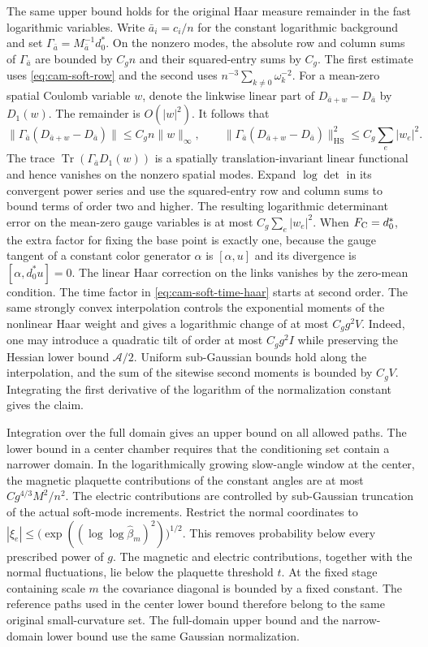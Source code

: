 \documentclass[11pt,a4paper]{article}
\numberwithin{equation}{section}
\newcommand{\Tr}{\operatorname{Tr}}
\begin{document}
The same upper bound holds for the original Haar measure remainder in the fast logarithmic variables. Write \(\bar a_i=c_i/n\) for the constant logarithmic background and set \(\Gamma_{\bar a}=M_{\bar a}^{-1}d_0^*\). On the nonzero modes, the absolute row and column sums of \(\Gamma_{\bar a}\) are bounded by \(C_gn\) and their squared-entry sums by \(C_g\). The first estimate uses \eqref{eq:cam-soft-row} and the second uses \(n^{-3}\sum_{k\ne0}\omega_k^{-2}\). For a mean-zero spatial Coulomb variable \(w\), denote the linkwise linear part of \(D_{\bar a+w}-D_{\bar a}\) by \(D_1(w)\). The remainder is \(O(|w|^2)\). It follows that
\[
 \|\Gamma_{\bar a}(D_{\bar a+w}-D_{\bar a})\|\le C_gn\|w\|_\infty,\qquad
 \|\Gamma_{\bar a}(D_{\bar a+w}-D_{\bar a})\|_{\mathrm{HS}}^2\le C_g\sum_e|w_e|^2 .
\]
The trace \(\Tr(\Gamma_{\bar a}D_1(w))\) is a spatially translation-invariant linear functional and hence vanishes on the nonzero spatial modes. Expand \(\log\det\) in its convergent power series and use the squared-entry row and column sums to bound terms of order two and higher. The resulting logarithmic determinant error on the mean-zero gauge variables is at most \(C_g\sum_e|w_e|^2\). When \(F_{\rm C}=d_0^*\), the extra factor for fixing the base point is exactly one, because the gauge tangent of a constant color generator \(\alpha\) is \([\alpha,u]\) and its divergence is \([\alpha,d_0^*u]=0\). The linear Haar correction on the links vanishes by the zero-mean condition. The time factor in \eqref{eq:cam-soft-time-haar} starts at second order. The same strongly convex interpolation controls the exponential moments of the nonlinear Haar weight and gives a logarithmic change of at most \(C_g g^2 V\). Indeed, one may introduce a quadratic tilt of order at most \(C_g g^2 I\) while preserving the Hessian lower bound \(\mathcal A/2\). Uniform sub-Gaussian bounds hold along the interpolation, and the sum of the sitewise second moments is bounded by \(C_gV\). Integrating the first derivative of the logarithm of the normalization constant gives the claim.

Integration over the full domain gives an upper bound on all allowed paths. The lower bound in a center chamber requires that the conditioning set contain a narrower domain. In the logarithmically growing slow-angle window at the center, the magnetic plaquette contributions of the constant angles are at most \(C g^{4/3}M^2/n^2\). The electric contributions are controlled by sub-Gaussian truncation of the actual soft-mode increments. Restrict the normal coordinates to \(|\xi_e|\le \bigl(\exp((\log\log\widehat\beta_m)^2)\bigr)^{1/2}\). This removes probability below every prescribed power of \(g\). The magnetic and electric contributions, together with the normal fluctuations, lie below the plaquette threshold \(t\). At the fixed stage containing scale \(m\) the covariance diagonal is bounded by a fixed constant. The reference paths used in the center lower bound therefore belong to the same original small-curvature set. The full-domain upper bound and the narrow-domain lower bound use the same Gaussian normalization.
\end{document}
